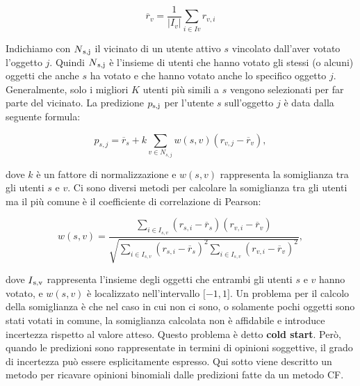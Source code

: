 \documentclass[letterpaper]{article} %
\begin{document}
\begin{center}
	\begin{equation}
	\overline{r}_v=\frac{1}{|I_v|} \sum_{i \in Iv} r_{v,i}
	\label{equazione6}
	\end{equation}
\end{center}

Indichiamo con $N\textsubscript{s,j}$ il vicinato di un utente attivo $s$ vincolato
dall'aver votato l'oggetto $j$. Quindi $N\textsubscript{s,j}$ è l'insieme di utenti che
hanno votato gli stessi (o alcuni) oggetti che anche $s$ ha votato e che
hanno votato anche lo specifico oggetto $j$. Generalmente, solo i migliori
$K$ utenti più simili a $s$ vengono selezionati per far parte del vicinato.
La predizione $p\textsubscript{s,j}$ per l'utente $s$ sull'oggetto $j$ è data dalla seguente
formula:

\begin{center}
	\begin{equation}
	p_{s,j}=\overline{r}_s+k \sum_{v \in N_{s,j}}w(s,v)(r_{v,j}-\overline{r}_v),
	\label{equazione7}
	\end{equation}
	
\end{center}

dove $k$ è un fattore di normalizzazione e $w(s,v)$ rappresenta la
somiglianza tra gli utenti $s$ e $v$. Ci sono diversi metodi per calcolare
la somiglianza tra gli utenti ma il più comune è il coefficiente di
correlazione di Pearson:

\begin{center}
	\begin{equation}
	w(s,v)=\frac{\sum_{i \in I_{s,v}}(r_{s,i}-\overline{r}_s)(r_{v,i}-\overline{r}_v)}{\sqrt{\sum_{i \in I_{s,v}} (r_{s,i}-\overline{r}_s)^2 \sum_{i \in I_{s,v}}(r_{v,i}-\overline{r}_v)^2}},
	\label{equazione8}
	\end{equation}
	
\end{center}

dove $I\textsubscript{s,v}$ rappresenta l'insieme degli oggetti che entrambi gli utenti $s$
e $v$ hanno votato, e $w(s,v)$ è localizzato nell'intervallo ${[}-1,1{]}$. Un
problema per il calcolo della somiglianza è che nel caso in cui non ci
sono, o solamente pochi oggetti sono stati votati in comune, la
somiglianza calcolata non è affidabile e introduce incertezza rispetto
al valore atteso. Questo problema è detto \textbf{cold start}. Però, quando le
predizioni sono rappresentate in termini di opinioni soggettive, il
grado di incertezza può essere esplicitamente espresso. Qui sotto viene
descritto un metodo per ricavare opinioni binomiali dalle predizioni
fatte da un metodo CF.
\end{document}

